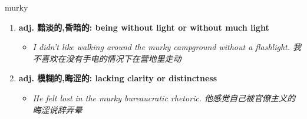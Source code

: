
\begin{frame}
{\huge murky}
\begin{center}
\begin{enumerate}\Large
  \item \textbf{adj. 黯淡的,昏暗的: being without light or without much light}
  \begin{itemize}
    \item \em{\Large{I didn't like walking around the murky campground without a flashlight. 我不喜欢在没有手电的情况下在营地里走动}}
  \end{itemize}
  \item \textbf{adj. 模糊的,晦涩的: lacking clarity or distinctness}
  \begin{itemize}
    \item \em{\Large{He felt lost in the murky bureaucratic rhetoric. 他感觉自己被官僚主义的晦涩说辞弄晕}}
  \end{itemize}
\end{enumerate}
\end{center}
\end{frame}
